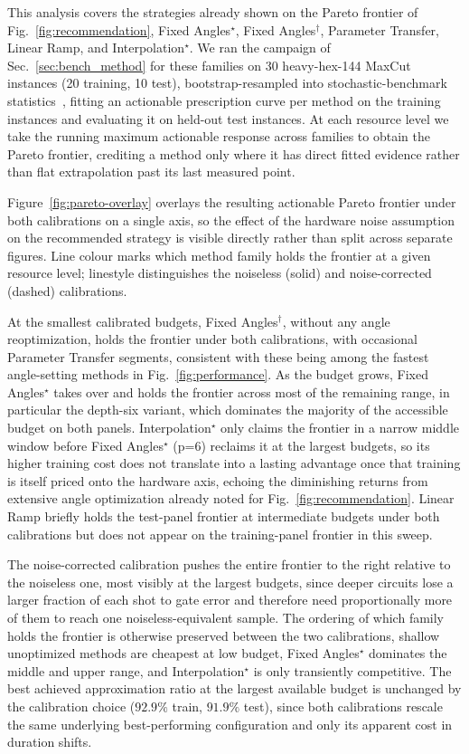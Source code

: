This analysis covers the strategies already shown on the Pareto
frontier of Fig.~\ref{fig:recommendation}, Fixed Angles$^\star$,
Fixed Angles$^\dagger$, Parameter Transfer, Linear Ramp, and
Interpolation$^\star$.
We ran the campaign of Sec.~\ref{sec:bench_method} for these
families on 30 heavy-hex-144 MaxCut instances (20 training, 10
test), bootstrap-resampled into stochastic-benchmark
statistics~\cite{Neira2024}, fitting an actionable prescription
curve per method on the training instances and evaluating it on
held-out test instances. At each resource level we take the running
maximum actionable response across families to obtain the Pareto
frontier, crediting a method only where it has direct fitted
evidence rather than flat extrapolation past its last measured
point.

Figure~\ref{fig:pareto-overlay} overlays the resulting actionable
Pareto frontier under both calibrations on a single axis, so the
effect of the hardware noise assumption on the recommended strategy
is visible directly rather than split across separate figures. Line
colour marks which method family holds the frontier at a given
resource level; linestyle distinguishes the noiseless (solid) and
noise-corrected (dashed) calibrations.

At the smallest calibrated budgets, Fixed Angles$^\dagger$, without
any angle reoptimization, holds the frontier under both calibrations,
with occasional Parameter Transfer segments, consistent with these
being among the fastest angle-setting methods in
Fig.~\ref{fig:performance}. As the budget grows, Fixed Angles$^\star$
takes over and holds the frontier across most of the remaining range,
in particular the depth-six variant, which dominates the majority of
the accessible budget on both panels. Interpolation$^\star$ only
claims the frontier in a narrow middle window before Fixed
Angles$^\star$ (p=6) reclaims it at the largest budgets, so its
higher training cost does not translate into a lasting advantage once
that training is itself priced onto the hardware axis, echoing the
diminishing returns from extensive angle optimization already noted
for Fig.~\ref{fig:recommendation}. Linear Ramp briefly holds the
test-panel frontier at intermediate budgets under both calibrations
but does not appear on the training-panel frontier in this sweep.

The noise-corrected calibration pushes the entire frontier to the
right relative to the noiseless one, most visibly at the largest
budgets, since deeper circuits lose a larger fraction of each shot to
gate error and therefore need proportionally more of them to reach
one noiseless-equivalent sample. The ordering of which family holds
the frontier is otherwise preserved between the two calibrations,
shallow unoptimized methods are cheapest at low budget, Fixed
Angles$^\star$ dominates the middle and upper range, and
Interpolation$^\star$ is only transiently competitive. The best
achieved approximation ratio at the largest available budget is
unchanged by the calibration choice ($92.9\%$ train, $91.9\%$ test),
since both calibrations rescale the same underlying best-performing
configuration and only its apparent cost in duration shifts.


